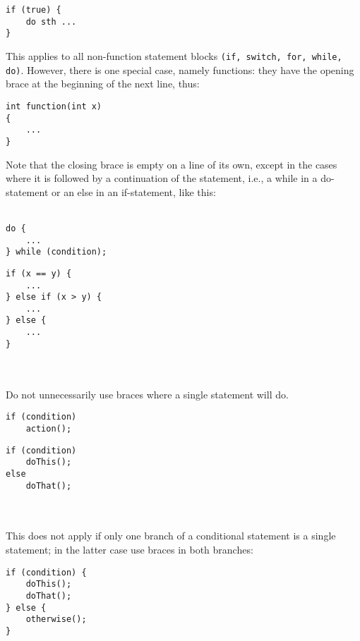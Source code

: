\documentclass[11pt]{article}
\begin{document}
\begin{Verbatim}
if (true) {
	do sth ...
}
\end{Verbatim}
This applies to all non-function statement blocks \texttt{(if, switch, for, while, do)}. However, there is one special case, namely functions: they have the opening brace at the beginning of the next line, thus:

\begin{Verbatim}
int function(int x)
{
	...
}
\end{Verbatim}

Note that the closing brace is empty on a line of its own, except in the cases where it is followed by a continuation of the statement, i.e., a while in a do-statement or an else in an if-statement, like this:
\\\\
\begin{minipage}[t]{0.5\textwidth}
\begin{Verbatim}
do {
	...
} while (condition);
\end{Verbatim}
\end{minipage}
\begin{minipage}[t]{0.5\textwidth}
\begin{Verbatim}
if (x == y) {
	...
} else if (x > y) {
	...
} else {
	...
}
\end{Verbatim}
\end{minipage}
\\\\
Do not unnecessarily use braces where a single statement will do.

\begin{minipage}[t]{0.5\textwidth}
\begin{Verbatim}
if (condition)
	action();
\end{Verbatim}
\end{minipage}
\begin{minipage}[t]{0.5\textwidth}
\begin{Verbatim}
if (condition)
	doThis();
else
	doThat();	
\end{Verbatim}
\end{minipage}
\\\\
This does not apply if only one branch of a conditional statement is a single statement; in the latter case use braces in both branches:

\begin{Verbatim}
if (condition) {
	doThis();
	doThat();
} else {
	otherwise();
}	
\end{Verbatim}
\end{document}
